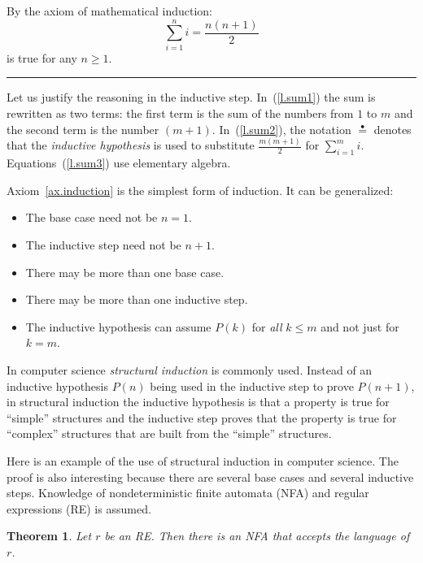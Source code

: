 \documentclass[12pt,a4paper]{article}
\newtheorem{theorem}{Theorem}
\newcommand*{\ih}{\stackrel{\bullet}{=}}
\newcommand*{\qed}{\hfill\rule[-2pt]{4pt}{10pt}}
\begin{document}
By the axiom of mathematical induction:
\[
\sum_{i=1}^n i = \frac{n(n+1)}{2}
\] is true for any $n\geq 1$.\qed

Let us justify the reasoning in the inductive step. In~(\ref{l.sum1}) the sum is rewritten as two terms: the first term is the sum of the numbers from $1$ to $m$ and the second term is the number $(m+1)$. In~(\ref{l.sum2}), the notation $\ih{}$ denotes that the \emph{inductive hypothesis} is used to substitute $\frac{m(m+1)}{2}$ for $\sum_{i=1}^m i$. Equations~(\ref{l.sum3}) use elementary algebra.

Axiom~\ref{ax.induction} is the simplest form of induction. It can be generalized:
\begin{itemize}
\item The base case need not be $n=1$.
\item The inductive step need not be $n+1$.
\item There may be more than one base case.
\item There may be more than one inductive step.
\item The inductive hypothesis can assume $P(k)$ for \emph{all} $k\leq m$ and not just for $k=m$.
\end{itemize}

In computer science \emph{structural induction} is commonly used. Instead of an inductive hypothesis $P(n)$ being used in the inductive step to prove $P(n+1)$, in structural induction the inductive hypothesis is that a property is true for ``simple'' structures and the inductive step proves that the property is true for ``complex'' structures that are built from the ``simple'' structures.

Here is an example of the use of structural induction in computer science. The proof is also interesting because there are several base cases and several inductive steps. Knowledge of nondeterministic finite automata (NFA) and regular expressions (RE) is assumed.

\begin{theorem}
Let $r$ be an RE. Then there is an NFA that accepts the language of $r$.
\end{theorem}
\end{document}
